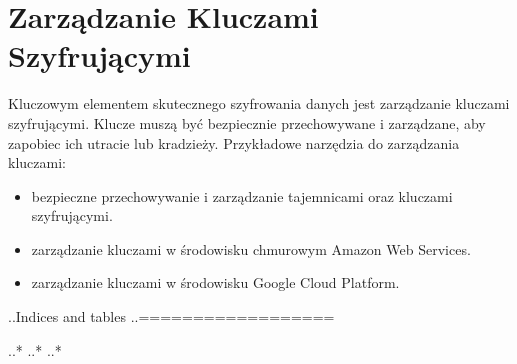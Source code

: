 \documentclass[letterpaper,10pt,polish]{sphinxmanual}
\begin{document}
\section{Zarządzanie Kluczami Szyfrującymi}
\label{\detokenize{sprawozdanie/source/rozdzialy/rozdzial5:zarzadzanie-kluczami-szyfrujacymi}}
\sphinxAtStartPar
Kluczowym elementem skutecznego szyfrowania danych jest zarządzanie
kluczami szyfrującymi. Klucze muszą być bezpiecznie przechowywane i
zarządzane, aby zapobiec ich utracie lub kradzieży. Przykładowe
narzędzia do zarządzania kluczami:
\begin{itemize}
\item {} 
\sphinxAtStartPar
{} \sphinxhyphen{} bezpieczne przechowywanie i zarządzanie
tajemnicami oraz kluczami szyfrującymi.

\item {} 
\sphinxAtStartPar
{} \sphinxhyphen{} zarządzanie kluczami w
środowisku chmurowym Amazon Web Services.

\item {} 
\sphinxAtStartPar
{} \sphinxhyphen{} zarządzanie kluczami w środowisku Google Cloud
Platform.

\end{itemize}

\sphinxAtStartPar
..Indices and tables
..==================

\sphinxAtStartPar
..* 
..* 
..* 



\renewcommand{\indexname}{Indeks}
\printindex
\end{document}
